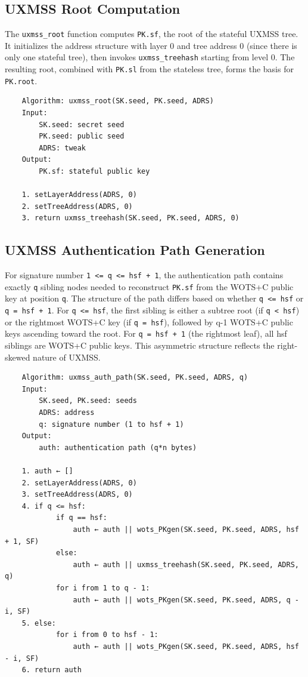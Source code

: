\subsection{UXMSS Root Computation}
The \texttt{uxmss\_root} function computes \texttt{PK.sf}, the root of the stateful UXMSS tree. It initializes the address structure with layer 0 and tree address 0 (since there is only one stateful tree), then invokes \texttt{uxmss\_treehash} starting from level 0. The resulting root, combined with \texttt{PK.sl} from the stateless tree, forms the basis for \texttt{PK.root}.
\begin{verbatim}
    Algorithm: uxmss_root(SK.seed, PK.seed, ADRS)
    Input:
        SK.seed: secret seed
        PK.seed: public seed
        ADRS: tweak
    Output:
        PK.sf: stateful public key

    1. setLayerAddress(ADRS, 0)
    2. setTreeAddress(ADRS, 0)
    3. return uxmss_treehash(SK.seed, PK.seed, ADRS, 0)
\end{verbatim}

\subsection{UXMSS Authentication Path Generation}
For signature number \texttt{1 <= q <= hsf + 1}, the authentication path contains exactly \texttt{q} sibling nodes needed to reconstruct \texttt{PK.sf} from the WOTS+C public key at position \texttt{q}. The structure of the path differs based on whether \texttt{q <= hsf} or \texttt{q = hsf + 1}. For \texttt{q <= hsf}, the first sibling is either a subtree root (if \texttt{q < hsf}) or the rightmost WOTS+C key (if \texttt{q = hsf}), followed by q-1 WOTS+C public keys ascending toward the root. For \texttt{q = hsf + 1} (the rightmost leaf), all hsf siblings are WOTS+C public keys. This asymmetric structure reflects the right-skewed nature of UXMSS.

\begin{verbatim}
    Algorithm: uxmss_auth_path(SK.seed, PK.seed, ADRS, q)
    Input:
        SK.seed, PK.seed: seeds
        ADRS: address
        q: signature number (1 to hsf + 1)
    Output:
        auth: authentication path (q*n bytes)

    1. auth ← []
    2. setLayerAddress(ADRS, 0)
    3. setTreeAddress(ADRS, 0)
    4. if q <= hsf:
            if q == hsf:
                auth ← auth || wots_PKgen(SK.seed, PK.seed, ADRS, hsf + 1, SF)
            else:
                auth ← auth || uxmss_treehash(SK.seed, PK.seed, ADRS, q)  
            for i from 1 to q - 1:
                auth ← auth || wots_PKgen(SK.seed, PK.seed, ADRS, q - i, SF)
    5. else:  
            for i from 0 to hsf - 1:
                auth ← auth || wots_PKgen(SK.seed, PK.seed, ADRS, hsf - i, SF)
    6. return auth
\end{verbatim}
